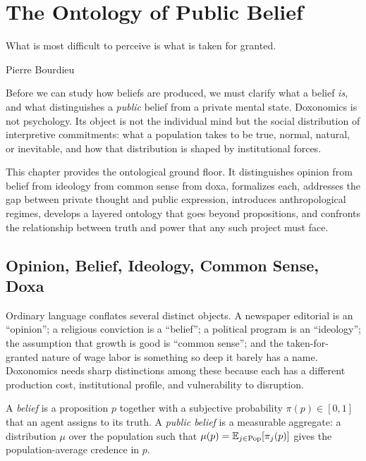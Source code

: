 \chapter{The Ontology of Public Belief}
\label{ch:ontology-belief}

\epigraph{What is most difficult to perceive is what is taken for granted.}{Pierre Bourdieu}

\noindent
Before we can study how beliefs are produced, we must clarify what a belief \emph{is}, and what distinguishes a \emph{public} belief from a private mental state.
Doxonomics is not psychology.
Its object is not the individual mind but the social distribution of interpretive commitments: what a population takes to be true, normal, natural, or inevitable, and how that distribution is shaped by institutional forces.

This chapter provides the ontological ground floor.
It distinguishes opinion from belief from ideology from common sense from doxa, formalizes each, addresses the gap between private thought and public expression, introduces anthropological regimes, develops a layered ontology that goes beyond propositions, and confronts the relationship between truth and power that any such project must face.


\section{Opinion, Belief, Ideology, Common Sense, Doxa}
\label{sec:ch2-taxonomy}

Ordinary language conflates several distinct objects.
A newspaper editorial is an ``opinion''; a religious conviction is a ``belief''; a political program is an ``ideology''; the assumption that growth is good is ``common sense''; and the taken-for-granted nature of wage labor is something so deep it barely has a name.
Doxonomics needs sharp distinctions among these because each has a different production cost, institutional profile, and vulnerability to disruption.

\begin{definition}[Belief]
\label{def:belief}
A \emph{belief} is a proposition $p$ together with a subjective probability $\pi(p) \in [0,1]$ that an agent assigns to its truth.
A \emph{public belief} is a measurable aggregate: a distribution $\mu$ over the population such that $\mu(p) = \mathbb{E}_{j \in \text{Pop}}[\pi_j(p)]$ gives the population-average credence in $p$.
\end{definition}

